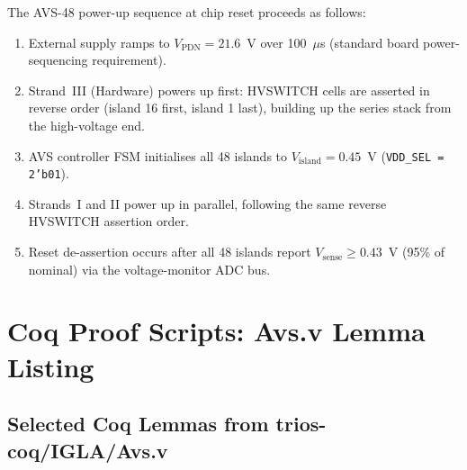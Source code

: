 The AVS-48 power-up sequence at chip reset proceeds as follows:

\begin{enumerate}
  \item External supply ramps to $V_\mathrm{PDN} = 21.6$~V over 100~$\mu$s
    (standard board power-sequencing requirement).
  \item Strand~III (Hardware) powers up first: HVSWITCH cells are
    asserted in reverse order (island 16 first, island 1 last),
    building up the series stack from the high-voltage end.
  \item AVS controller FSM initialises all 48 islands to
    $V_\mathrm{island} = 0.45$~V (\texttt{VDD\_SEL = 2'b01}).
  \item Strands~I and II power up in parallel, following the same
    reverse HVSWITCH assertion order.
  \item Reset de-assertion occurs after all 48 islands report
    $V_\mathrm{sense} \geq 0.43$~V (95\% of nominal) via the
    voltage-monitor ADC bus.
\end{enumerate}

\section{Coq Proof Scripts: Avs.v Lemma Listing}
\label{app:coq_proofs}

\subsection{Selected Coq Lemmas from trios-coq/IGLA/Avs.v}

